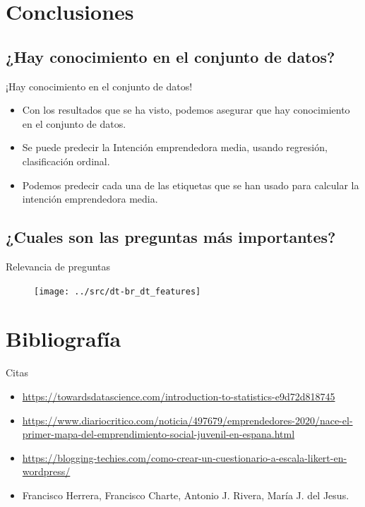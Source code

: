 \documentclass{beamer}
\begin{document}
\section{Conclusiones}
	\subsection{¿Hay conocimiento en el conjunto de datos?}
		\begin{frame}{¡Hay conocimiento en el conjunto de datos!}
			\begin{itemize}
				\item Con los resultados que se ha visto, podemos asegurar que hay conocimiento en el conjunto de datos.
				\item Se puede predecir la Intención emprendedora media, usando regresión, clasificación ordinal.
				\item Podemos predecir cada una  de las etiquetas que se han usado para calcular la intención emprendedora media.
			\end{itemize}
		\end{frame}
	\subsection{¿Cuales son las preguntas más importantes?}
		\begin{frame}{Relevancia de preguntas}
 			\begin{figure}
				\texttt{[image: ../src/dt-br\_dt\_features]}
			\end{figure}
		\end{frame}
\section{Bibliografía}
\begin{frame}{Citas}
	\begin{itemize}
		\item \url{https://towardsdatascience.com/introduction-to-statistics-e9d72d818745}
		\item \url{https://www.diariocritico.com/noticia/497679/emprendedores-2020/nace-el-primer-mapa-del-emprendimiento-social-juvenil-en-espana.html}
		\item \url{https://blogging-techies.com/como-crear-un-cuestionario-a-escala-likert-en-wordpress/}
		\item Francisco Herrera, Francisco Charte, Antonio J. Rivera, María J. del Jesus.
	\end{itemize}
\end{frame}
\end{document}
